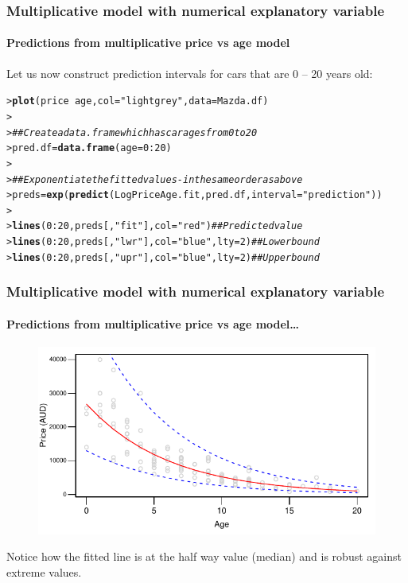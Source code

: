 \documentclass{beamer}\usepackage[]{graphicx}\usepackage[]{xcolor}
\makeatletter
\newcommand{\hlnum}[1]{\textcolor[rgb]{0.686,0.059,0.569}{#1}}%
\newcommand{\hlstr}[1]{\textcolor[rgb]{0.192,0.494,0.8}{#1}}%
\newcommand{\hlcom}[1]{\textcolor[rgb]{0.678,0.584,0.686}{\textit{#1}}}%
\newcommand{\hlopt}[1]{\textcolor[rgb]{0,0,0}{#1}}%
\newcommand{\hlstd}[1]{\textcolor[rgb]{0.345,0.345,0.345}{#1}}%
\newcommand{\hlkwb}[1]{\textcolor[rgb]{0.69,0.353,0.396}{#1}}%
\newcommand{\hlkwc}[1]{\textcolor[rgb]{0.333,0.667,0.333}{#1}}%
\newcommand{\hlkwd}[1]{\textcolor[rgb]{0.737,0.353,0.396}{\textbf{#1}}}%
\newenvironment{kframe}{%
 \def\at@end@of@kframe{}%
 \ifinner\ifhmode%
  \def\at@end@of@kframe{\end{minipage}}%
  \begin{minipage}{\columnwidth}%
 \fi\fi%
 \def\FrameCommand##1{\hskip\@totalleftmargin \hskip-\fboxsep
 \colorbox{shadecolor}{##1}\hskip-\fboxsep
     \hskip-\linewidth \hskip-\@totalleftmargin \hskip\columnwidth}%
 \MakeFramed {\advance\hsize-\width
   \@totalleftmargin\z@ \linewidth\hsize
   \@setminipage}}%
 {\par\unskip\endMakeFramed%
 \at@end@of@kframe}
\newenvironment{knitrout}{}{} %
\makeatother
\begin{document}
\begin{frame}[fragile]
\frametitle{Multiplicative model with numerical explanatory variable}
\framesubtitle{Predictions from multiplicative price vs age model}
Let us now construct prediction intervals for cars that are 0 -- 20 years old:
 
\begin{knitrout}\scriptsize
{}\color{fgcolor}\begin{kframe}
\begin{alltt}
\hlstd{> }\hlkwd{plot}\hlstd{(price}\hlopt{~}\hlstd{age,} \hlkwc{col}\hlstd{=}\hlstr{"light grey"}\hlstd{,}\hlkwc{data}\hlstd{=Mazda.df)}
\hlstd{> }
\hlstd{> }\hlcom{## Create a data.frame which has car ages from 0 to 20}
\hlstd{> }\hlstd{pred.df}\hlkwb{=}\hlkwd{data.frame}\hlstd{(}\hlkwc{age}\hlstd{=}\hlnum{0}\hlopt{:}\hlnum{20}\hlstd{)}
\hlstd{> }
\hlstd{> }\hlcom{## Exponentiate the fitted values - in the same order as above}
\hlstd{> }\hlstd{preds} \hlkwb{=} \hlkwd{exp}\hlstd{(}\hlkwd{predict}\hlstd{(LogPriceAge.fit,pred.df,} \hlkwc{interval}\hlstd{=}\hlstr{"prediction"}\hlstd{))}
\hlstd{> }
\hlstd{> }\hlkwd{lines}\hlstd{(}\hlnum{0}\hlopt{:}\hlnum{20}\hlstd{, preds[,}\hlstr{"fit"}\hlstd{],}\hlkwc{col}\hlstd{=}\hlstr{"red"}\hlstd{)} \hlcom{## Predicted value}
\hlstd{> }\hlkwd{lines}\hlstd{(}\hlnum{0}\hlopt{:}\hlnum{20}\hlstd{, preds[,}\hlstr{"lwr"}\hlstd{],}\hlkwc{col}\hlstd{=}\hlstr{"blue"}\hlstd{,} \hlkwc{lty}\hlstd{=}\hlnum{2}\hlstd{)} \hlcom{## Lower bound }
\hlstd{> }\hlkwd{lines}\hlstd{(}\hlnum{0}\hlopt{:}\hlnum{20}\hlstd{, preds[,}\hlstr{"upr"}\hlstd{],}\hlkwc{col}\hlstd{=}\hlstr{"blue"}\hlstd{,} \hlkwc{lty}\hlstd{=}\hlnum{2}\hlstd{)} \hlcom{## Upper bound }
\end{alltt}
\end{kframe}
\end{knitrout}

\end{frame}


\begin{frame}[fragile]
\frametitle{Multiplicative model with numerical explanatory variable}
\framesubtitle{Predictions from multiplicative price vs age model\ldots}


\begin{figure}
  \centering
  \includegraphics{figure/RC-H06-041}
\end{figure}

Notice how the fitted line is at the half way value (median) and is robust against extreme values.
\end{frame}
\end{document}
